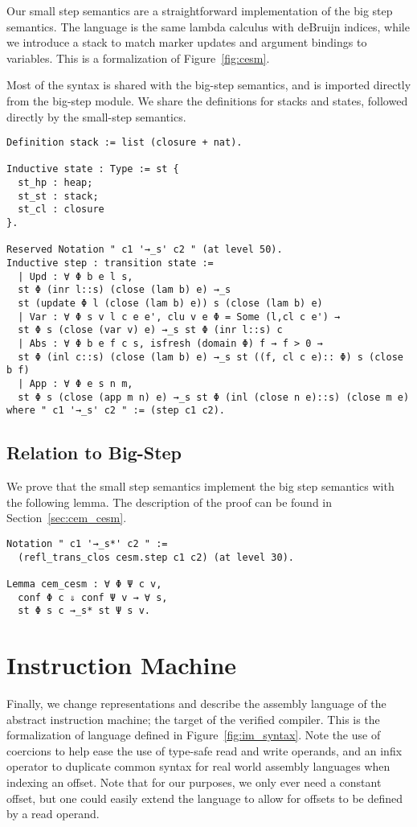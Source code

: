 Our small step semantics are a straightforward implementation of the big step
semantics. The language is the same lambda calculus with deBruijn indices, while
we introduce a stack to match marker updates and argument bindings to variables.
This is a formalization of Figure~\ref{fig:cesm}. 

Most of the syntax is shared with the big-step semantics, and is imported
directly from the big-step module. We share the definitions for stacks and
states, followed directly by the small-step semantics.
\begin{verbatim}
Definition stack := list (closure + nat).

Inductive state : Type := st {
  st_hp : heap; 
  st_st : stack;
  st_cl : closure
}.

Reserved Notation " c1 '→_s' c2 " (at level 50).
Inductive step : transition state :=
  | Upd : ∀ Φ b e l s, 
  st Φ (inr l::s) (close (lam b) e) →_s 
  st (update Φ l (close (lam b) e)) s (close (lam b) e)
  | Var : ∀ Φ s v l c e e', clu v e Φ = Some (l,cl c e') → 
  st Φ s (close (var v) e) →_s st Φ (inr l::s) c
  | Abs : ∀ Φ b e f c s, isfresh (domain Φ) f → f > 0 → 
  st Φ (inl c::s) (close (lam b) e) →_s st ((f, cl c e):: Φ) s (close b f)
  | App : ∀ Φ e s n m, 
  st Φ s (close (app m n) e) →_s st Φ (inl (close n e)::s) (close m e)
where " c1 '→_s' c2 " := (step c1 c2).
\end{verbatim}

\subsection{Relation to Big-Step}

We prove that the small step semantics implement the big step semantics with the
following lemma. The description of the proof can be found in
Section~\ref{sec:cem_cesm}. 

\begin{verbatim}
Notation " c1 '→_s*' c2 " := 
  (refl_trans_clos cesm.step c1 c2) (at level 30). 

Lemma cem_cesm : ∀ Φ Ψ c v, 
  conf Φ c ⇓ conf Ψ v → ∀ s, 
  st Φ s c →_s* st Ψ s v. 
\end{verbatim}

\section{Instruction Machine} 

Finally, we change representations and describe the assembly language of the
abstract instruction machine; the target of the verified compiler. This is the
formalization of language defined in Figure~\ref{fig:im_syntax}. Note the use of
coercions to help ease the use of type-safe read and write operands, and an
infix operator to duplicate common syntax for real world assembly languages when
indexing an offset. Note that for our purposes, we only ever need a constant
offset, but one could easily extend the language to allow for offsets to be
defined by a read operand.  

